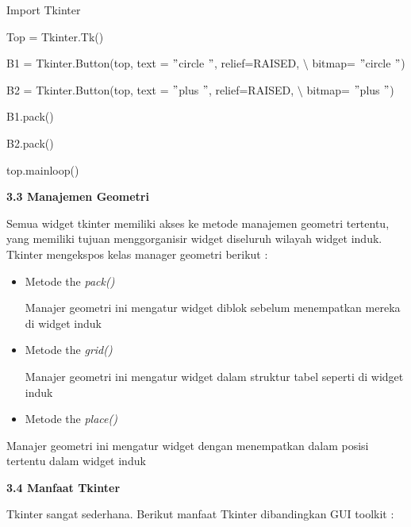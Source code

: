 \documentclass [12pt,a4paper,notitlepage,oneside,bahasa]{article}
\begin{document}
\begin{enumerate}
\begin{itemize}
{\fontsize{10pt}{10pt}\selectfont Import Tkinter} \par
\vspace{10pt}
{\fontsize{10pt}{10pt}\selectfont Top = Tkinter.Tk()} \par
\vspace{10pt}
{\fontsize{10pt}{10pt}\selectfont B1 = Tkinter.Button(top, text = $ " $circle $ " $, relief=RAISED,  $  \setminus  $ bitmap= $ " $circle $ " $)} \par
{\fontsize{10pt}{10pt}\selectfont B2 = Tkinter.Button(top, text = $ " $plus $ " $, relief=RAISED,  $  \setminus  $ bitmap= $ " $plus $ " $)} \par
\vspace{10pt}
{\fontsize{10pt}{10pt}\selectfont B1.pack()} \par
{\fontsize{10pt}{10pt}\selectfont B2.pack()} \par
{\fontsize{10pt}{10pt}\selectfont top.mainloop()} \par
\vspace{10pt}
\noindent 
\textbf{3.3 Manajemen Geometri} \par
\noindent 
 \hspace*{0.5in} Semua widget tkinter memiliki akses ke metode manajemen geometri tertentu, yang memiliki tujuan menggorganisir widget diseluruh wilayah widget induk. Tkinter mengekspos kelas manager geometri berikut : \par
\noindent 
\begin{itemize}
\item Metode the \textit{pack()} \par
\noindent 
Manajer geometri ini mengatur widget diblok sebelum menempatkan mereka di widget induk \par
\noindent 
\item Metode the \textit{grid()} \par
\noindent 
Manajer geometri ini mengatur widget dalam struktur tabel seperti di widget induk \par
\noindent 
\item Metode the  \textit{place()}\end{itemize} \par
\noindent 
Manajer geometri ini mengatur widget dengan menempatkan dalam posisi tertentu dalam widget induk \par
\vspace{12pt}
\noindent 
\textbf{3.4 Manfaat Tkinter} \par
Tkinter sangat sederhana. Berikut manfaat Tkinter dibandingkan GUI toolkit : \par

\end{itemize}
\end{enumerate}
\end{document}
